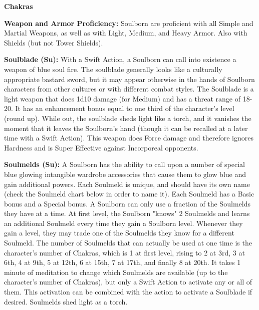 \begin{extraclasstable}{\textbf{Chakras}}
\end{extraclasstable}

\classfeatures

\textbf{Weapon and Armor Proficiency:} Soulborn are proficient with all Simple and Martial Weapons, as well as with Light, Medium, and Heavy Armor. Also with Shields (but not Tower Shields).

\textbf{Soulblade (Su):} With a Swift Action, a Soulborn can call into existence a weapon of blue soul fire. The soulblade generally looks like a culturally appropriate bastard sword, but it may appear otherwise in the hands of Soulborn characters from other cultures or with different combat styles. The Soulblade is a light weapon that does 1d10 damage (for Medium) and has a threat range of 18-20. It has an enhancement bonus equal to one third of the character's level (round up). While out, the soulblade sheds light like a torch, and it vanishes the moment that it leaves the Soulborn's hand (though it can be recalled at a later time with a Swift Action). This weapon does Force damage and therefore ignores Hardness and is Super Effective against Incorporeal opponents.

\textbf{Soulmelds (Su):} A Soulborn has the ability to call upon a number of special blue glowing intangible wardrobe accessories that cause them to glow blue and gain additional powers. Each Soulmeld is unique, and should have its own name (check the Soulmeld chart below in order to name it). Each Soulmeld has a Basic bonus and a Special bonus. A Soulborn can only use a fraction of the Soulmelds they have at a time. At first level, the Soulborn "knows" 2 Soulmelds and learns an additional Soulmeld every time they gain a Soulborn level. Whenever they gain a level, they may trade one of the Soulmelds they know for a different Soulmeld. The number of Soulmelds that can actually be used at one time is the character's number of Chakras, which is 1 at first level, rising to 2 at 3rd, 3 at 6th, 4 at 9th, 5 at 12th, 6 at 15th, 7 at 17th, and finally 8 at 20th. It takes 1 minute of meditation to change which Soulmelds are available (up to the character's number of Chakras), but only a Swift Action to activate any or all of them. This activation can be combined with the action to activate a Soulblade if desired. Soulmelds shed light as a torch.

